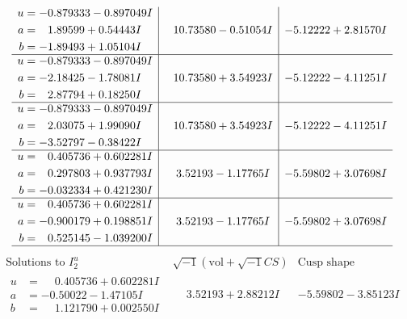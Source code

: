 \documentclass[1p]{elsarticle_modified}
\theoremstyle{definition}
\newcommand{\I}{\sqrt{-1}}
\begin{document}
$$\begin{array}{c|c|c}
\begin{aligned}
u &= -0.879333 - 0.897049 I \\
a &= \phantom{-}1.89599 + 0.54443 I \\
b &= -1.89493 + 1.05104 I\end{aligned}
 & \phantom{-}10.73580 - 0.51054 I & -5.12222 + 2.81570 I \\ \hline\begin{aligned}
u &= -0.879333 - 0.897049 I \\
a &= -2.18425 - 1.78081 I \\
b &= \phantom{-}2.87794 + 0.18250 I\end{aligned}
 & \phantom{-}10.73580 + 3.54923 I & -5.12222 - 4.11251 I \\ \hline\begin{aligned}
u &= -0.879333 - 0.897049 I \\
a &= \phantom{-}2.03075 + 1.99090 I \\
b &= -3.52797 - 0.38422 I\end{aligned}
 & \phantom{-}10.73580 + 3.54923 I & -5.12222 - 4.11251 I \\ \hline\begin{aligned}
u &= \phantom{-}0.405736 + 0.602281 I \\
a &= \phantom{-}0.297803 + 0.937793 I \\
b &= -0.032334 + 0.421230 I\end{aligned}
 & \phantom{-}3.52193 - 1.17765 I & -5.59802 + 3.07698 I \\ \hline\begin{aligned}
u &= \phantom{-}0.405736 + 0.602281 I \\
a &= -0.900179 + 0.198851 I \\
b &= \phantom{-}0.525145 - 1.039200 I\end{aligned}
 & \phantom{-}3.52193 - 1.17765 I & -5.59802 + 3.07698 I\\
 \hline 
 \end{array}$$\newpage$$\begin{array}{c|c|c}  
\text{Solutions to }I^u_{2}& \I (\text{vol} + \sqrt{-1}CS) & \text{Cusp shape}\\
 \hline 
\begin{aligned}
u &= \phantom{-}0.405736 + 0.602281 I \\
a &= -0.50022 - 1.47105 I \\
b &= \phantom{-}1.121790 + 0.002550 I\end{aligned}
 & \phantom{-}3.52193 + 2.88212 I & -5.59802 - 3.85123 I \\ \hline\begin{aligned}

\end{aligned}
\end{array}$$
\end{document}
